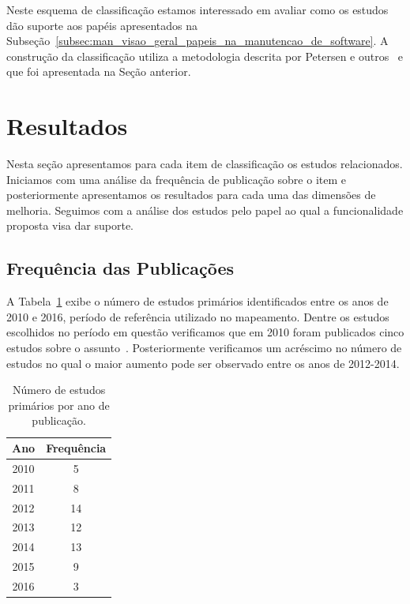 Neste esquema de classificação estamos interessado em avaliar como os estudos
dão suporte aos papéis apresentados na
Subseção~\ref{subsec:man_visao_geral_papeis_na_manutencao_de_software}. A
construção da classificação utiliza a metodologia descrita por Petersen e
outros~\cite{Petersen2008} e que foi apresentada na Seção anterior.

\section{Resultados}
\label{sec:mapeamento_resultados}

Nesta seção apresentamos para cada item de classificação os estudos
relacionados. Iniciamos com uma análise da frequência de publicação sobre o item
e posteriormente apresentamos os resultados para cada uma das dimensões de
melhoria. Seguimos com a análise dos estudos pelo papel ao qual a funcionalidade
proposta visa dar suporte.

\subsection{Frequência das Publicações}
\label{sub:frequencia_publicacao}

A Tabela~\ref{tab:publicacao_por_ano} exibe o número de estudos primários
identificados entre os anos de 2010 e 2016, período de referência utilizado no
mapeamento. Dentre os estudos escolhidos no período em questão verificamos que
em 2010 foram publicados cinco estudos sobre o
assunto~\cite{sun2010discriminative,gegick2010identifying,song2010jdf,nagwani2010predictive,zimmermann2010makes}.
Posteriormente verificamos um acréscimo no número de estudos no qual o maior
aumento pode ser observado entre os anos de 2012\@-\@2014.

\begin{table}[htpb]
\centering
\begin{tabular}{@{}cc@{}}
\toprule
\multicolumn{1}{l}{\textbf{Ano}} & \textbf{Frequência} \\ \midrule
2010 & 5 \\
2011 & 8 \\
2012 & 14 \\
2013 & 12 \\
2014 & 13 \\
2015 & 9 \\
2016 & 3 \\ \bottomrule
\end{tabular}
\caption{Número de estudos primários por ano de publicação.}
\label{tab:publicacao_por_ano}
\end{table}

